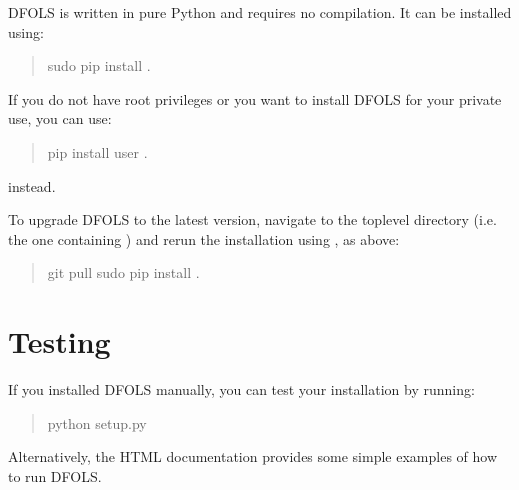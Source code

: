 \documentclass[letterpaper,10pt,english]{sphinxmanual}
\begin{document}
DFO\sphinxhyphen{}LS is written in pure Python and requires no compilation. It can be installed using:
\begin{quote}

\begin{sphinxVerbatim}[commandchars=\\\{\}]
\PYGZdl{} \PYG{o}{[}sudo\PYG{o}{]} pip install .
\end{sphinxVerbatim}
\end{quote}

If you do not have root privileges or you want to install DFO\sphinxhyphen{}LS for your private use, you can use:
\begin{quote}

\begin{sphinxVerbatim}[commandchars=\\\{\}]
\PYGZdl{} pip install \PYGZhy{}\PYGZhy{}user .
\end{sphinxVerbatim}
\end{quote}

instead.

To upgrade DFO\sphinxhyphen{}LS to the latest version, navigate to the top\sphinxhyphen{}level directory (i.e. the one containing ) and rerun the installation using , as above:
\begin{quote}

\begin{sphinxVerbatim}[commandchars=\\\{\}]
\PYGZdl{} git pull
\PYGZdl{} \PYG{o}{[}sudo\PYG{o}{]} pip install .  
\end{sphinxVerbatim}
\end{quote}


\section{Testing}
\label{\detokenize{install:testing}}
If you installed DFO\sphinxhyphen{}LS manually, you can test your installation by running:
\begin{quote}

\begin{sphinxVerbatim}[commandchars=\\\{\}]
\PYGZdl{} python setup.py 
\end{sphinxVerbatim}
\end{quote}

Alternatively, the HTML documentation provides some simple examples of how to run DFO\sphinxhyphen{}LS.
\end{document}
